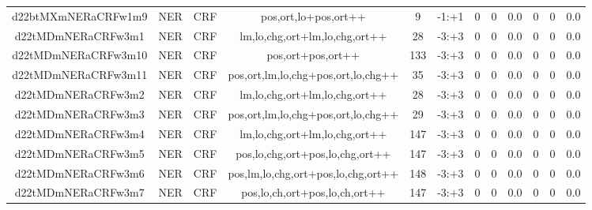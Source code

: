 \documentclass[a4paper]{article}
\begin{document}
\begin{landscape}
\begin{center}
\begin{tabular}{ |c|c|c|c|c|c|c|c|c|c|c|c|}
 
 	
 	\small{ d22btMXmNERaCRFw1m9 } & \small{ NER} & \small{  CRF }  & pos,ort,lo+pos,ort++  &  9 &  \small{  -1:+1 }  &  0 & 0 & 0.0  &  0 & 0 & 0.0 \\
 	

 
 	
 	\small{ d22tMDmNERaCRFw3m1 } & \small{ NER} & \small{  CRF }  & lm,lo,chg,ort+lm,lo,chg,ort++  &  28 &  \small{  -3:+3 }  &  0 & 0 & 0.0  &  0 & 0 & 0.0 \\
 	

 
 	
 	\small{ d22tMDmNERaCRFw3m10 } & \small{ NER} & \small{  CRF }  & pos,ort+pos,ort++  &  133 &  \small{  -3:+3 }  &  0 & 0 & 0.0  &  0 & 0 & 0.0 \\
 	

 
 	
 	\small{ d22tMDmNERaCRFw3m11 } & \small{ NER} & \small{  CRF }  & pos,ort,lm,lo,chg+pos,ort,lo,chg++  &  35 &  \small{  -3:+3 }  &  0 & 0 & 0.0  &  0 & 0 & 0.0 \\
 	

 
 	
 	\small{ d22tMDmNERaCRFw3m2 } & \small{ NER} & \small{  CRF }  & lm,lo,chg,ort+lm,lo,chg,ort++  &  28 &  \small{  -3:+3 }  &  0 & 0 & 0.0  &  0 & 0 & 0.0 \\
 	

 
 	
 	\small{ d22tMDmNERaCRFw3m3 } & \small{ NER} & \small{  CRF }  & pos,ort,lm,lo,chg+pos,ort,lo,chg++  &  29 &  \small{  -3:+3 }  &  0 & 0 & 0.0  &  0 & 0 & 0.0 \\
 	

 
 	
 	\small{ d22tMDmNERaCRFw3m4 } & \small{ NER} & \small{  CRF }  & lm,lo,chg,ort+lm,lo,chg,ort++  &  147 &  \small{  -3:+3 }  &  0 & 0 & 0.0  &  0 & 0 & 0.0 \\
 	

 
 	
 	\small{ d22tMDmNERaCRFw3m5 } & \small{ NER} & \small{  CRF }  & pos,lo,chg,ort+pos,lo,chg,ort++  &  147 &  \small{  -3:+3 }  &  0 & 0 & 0.0  &  0 & 0 & 0.0 \\
 	

 
 	
 	\small{ d22tMDmNERaCRFw3m6 } & \small{ NER} & \small{  CRF }  & pos,lm,lo,chg,ort+pos,lo,chg,ort++  &  148 &  \small{  -3:+3 }  &  0 & 0 & 0.0  &  0 & 0 & 0.0 \\
 	

 
 	
 	\small{ d22tMDmNERaCRFw3m7 } & \small{ NER} & \small{  CRF }  & pos,lo,ch,ort+pos,lo,ch,ort++  &  147 &  \small{  -3:+3 }  &  0 & 0 & 0.0  &  0 & 0 & 0.0 \\
 	


\end{tabular}
\end{center}
\end{landscape}
\end{document}
